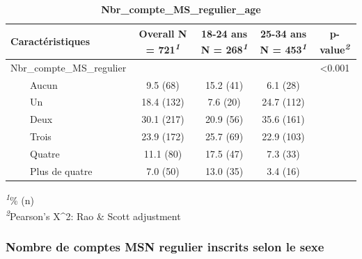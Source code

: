 \documentclass[
]{article}
\begin{document}
\newpage
\begin{table}[!t]
\caption{\label{tab:unnamed-chunk-48}\textbf{Nbr\_compte\_MS\_regulier\_age}} 
\fontsize{12.0pt}{14.4pt}\selectfont
\begin{tabular*}{\linewidth}{@{\extracolsep{\fill}}lcccc}
\toprule
\textbf{Caractéristiques} & \textbf{Overall}  N = 721\textsuperscript{\textit{1}} & \textbf{18-24 ans}  N = 268\textsuperscript{\textit{1}} & \textbf{25-34 ans}  N = 453\textsuperscript{\textit{1}} & \textbf{p-value}\textsuperscript{\textit{2}} \\ 
\midrule\addlinespace[2.5pt]
Nbr\_compte\_MS\_regulier &  &  &  & <0.001 \\ 
    Aucun & 9.5 (68) & 15.2 (41) & 6.1 (28) &  \\ 
    Un & 18.4 (132) & 7.6 (20) & 24.7 (112) &  \\ 
    Deux & 30.1 (217) & 20.9 (56) & 35.6 (161) &  \\ 
    Trois & 23.9 (172) & 25.7 (69) & 22.9 (103) &  \\ 
    Quatre & 11.1 (80) & 17.5 (47) & 7.3 (33) &  \\ 
    Plus de quatre & 7.0 (50) & 13.0 (35) & 3.4 (16) &  \\ 
\bottomrule
\end{tabular*}
\begin{minipage}{\linewidth}
\textsuperscript{\textit{1}}\% (n)\\
\textsuperscript{\textit{2}}Pearson's X\^{}2: Rao \& Scott adjustment\\
\end{minipage}
\end{table}

\vspace{1cm}

\hypertarget{nombre-de-comptes-msn-regulier-inscrits-selon-le-sexe}{%
\subsubsection{Nombre de comptes MSN regulier inscrits selon le
sexe}\label{nombre-de-comptes-msn-regulier-inscrits-selon-le-sexe}}
\end{document}
